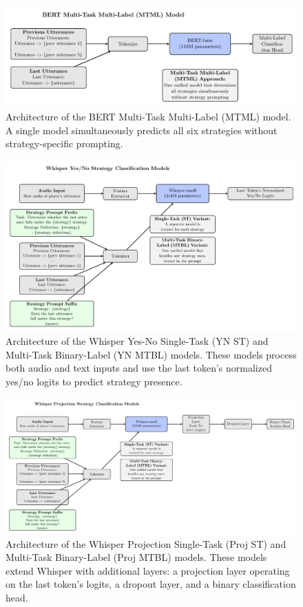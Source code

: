 \documentclass{article}
\begin{document}
\begin{figure}[H]
    \centering
    \includegraphics[width=\textwidth]{figures/pdf/bert_mtml.pdf}
    \caption{Architecture of the BERT Multi-Task Multi-Label (MTML) model. A single model simultaneously predicts all six strategies without strategy-specific prompting.}
    \label{fig:app_bert_mtml}
\end{figure}

\begin{figure}[H]
    \centering
    \includegraphics[width=\textwidth]{figures/pdf/whisper_yn_st_and_mtbl.pdf}
    \caption{Architecture of the Whisper Yes-No Single-Task (YN ST) and Multi-Task Binary-Label (YN MTBL) models. These models process both audio and text inputs and use the last token's normalized yes/no logits to predict strategy presence.}
    \label{fig:app_whisper_yn_st_and_mtbl}
\end{figure}

\begin{figure}[H]
    \centering
    \includegraphics[width=\textwidth]{figures/pdf/whisper_proj_st_and_mtbl.pdf}
    \caption{Architecture of the Whisper Projection Single-Task (Proj ST) and Multi-Task Binary-Label (Proj MTBL) models. These models extend Whisper with additional layers: a projection layer operating on the last token's logits, a dropout layer, and a binary classification head.}
    \label{fig:app_whisper_proj_st_and_mtbl}
\end{figure}
\end{document}
